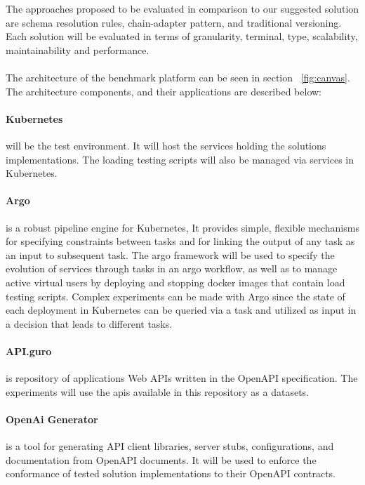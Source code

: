 The approaches proposed to be evaluated in comparison to our suggested solution are schema resolution rules, chain-adapter pattern, and traditional versioning.
Each solution will be evaluated in terms of granularity, terminal, type, scalability, maintainability and performance.
\paragraph{}

The architecture of the benchmark platform can be seen in section ~\ref{fig:canvas}.
The architecture components, and their applications are described below:

\paragraph{Kubernetes ~\cite{kubernetes}} will be the test environment.
It will host the services holding the solutions implementations.
The loading testing scripts will also be managed via services in Kubernetes.

\paragraph{Argo ~\cite{argo}} is a robust pipeline engine for Kubernetes, It provides simple, flexible mechanisms for specifying constraints
between tasks and for linking the output of any task as an input to subsequent task.
The argo framework will be used to specify the evolution of services through tasks in an argo workflow,
as well as to manage active virtual users by deploying and stopping docker images that contain load testing scripts.
Complex experiments can be made with Argo since the state of each deployment in Kubernetes can be queried via a task
and utilized as input in a decision that leads to different tasks.

\paragraph{API.guro  ~\cite{apiguro}} is repository of applications Web APIs written in the OpenAPI specification.
The experiments will use the apis available in this repository as a datasets.

\paragraph{OpenAi Generator ~\cite{openapigenerator}} is a tool for generating API client libraries, server stubs, configurations, and documentation from OpenAPI documents.
It will be used to enforce the conformance of tested solution implementations to their OpenAPI contracts.

